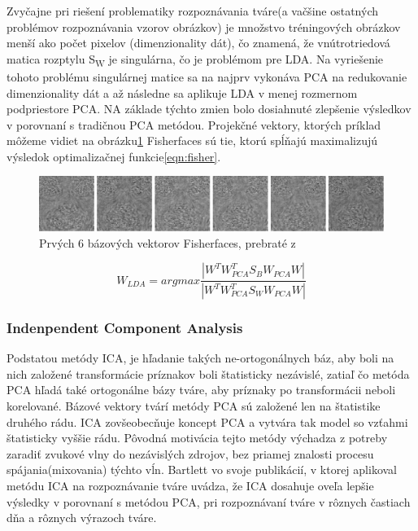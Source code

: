 Zvyčajne pri riešení problematiky rozpoznávania tváre(a vačšine ostatných problémov rozpoznávania vzorov obrázkov) je množstvo tréningových obrázkov menší ako počet pixelov
(dimenzionality dát), čo znamená, že vnútrotriedová matica rozptylu S\textsubscript{W} je singulárna, čo je problémom pre LDA.
Na vyriešenie tohoto problému singulárnej matice sa na najprv vykonáva PCA na redukovanie dimenzionality dát a
až následne sa aplikuje LDA v menej rozmernom podpriestore PCA.
NA základe týchto zmien bolo dosiahnuté zlepšenie výsledkov v porovnaní s tradičnou PCA metódou.
Projekčné vektory, ktorých príklad môžeme vidiet na obrázku\ref{fig:fisherfaces}  Fisherfaces sú tie, ktorú spĺňajú maximalizujú výsledok optimalizačnej funkcie\eqref{eqn:fisher}.

\begin{figure}[H]
	\centering
	\includegraphics[width=1\linewidth]{img/fisherfaces.png}
	\caption{Prvých 6 bázových vektorov Fisherfaces, prebraté z\cite[s.~46]{handbookbio}}
	\label{fig:fisherfaces}
\end{figure}

\begin{equation}\label{eqn:fisher}
	W_{LDA} = arg max \frac{|W^T W_{PCA}^T S_B W_{PCA} W|}{|W^T W_{PCA}^T S_W W_{PCA} W|}
\end{equation}

\subsubsection{Indenpendent Component Analysis}
Podstatou metódy ICA, je hľadanie takých ne-ortogonálnych báz,
aby boli na nich založené transformácie príznakov boli štatisticky nezávislé, zatiaľ čo
metóda PCA hľadá také ortogonálne bázy tváre, aby príznaky po transformácii neboli korelované\cite{handbookbio}.
Bázové vektory tvárí metódy PCA sú založené len na štatistike druhého rádu.
ICA zovšeobecňuje koncept PCA a vytvára tak model so vzťahmi štatisticky vyššie rádu.
Pôvodná motivácia tejto metódy výchadza z potreby zaradiť zvukové vlny do nezávislých zdrojov, bez priamej znalosti procesu spájania(mixovania) týchto vĺn\cite{handbookbio}.
Bartlett vo svoje publikácií\cite{bartlett2002face}, v ktorej aplikoval metódu ICA
na rozpoznávanie tváre uvádza, že ICA dosahuje oveľa lepšie výsledky v porovnaní s metódou PCA, pri rozpoznávaní tváre v rôznych častiach dňa a rôznych výrazoch tváre.

